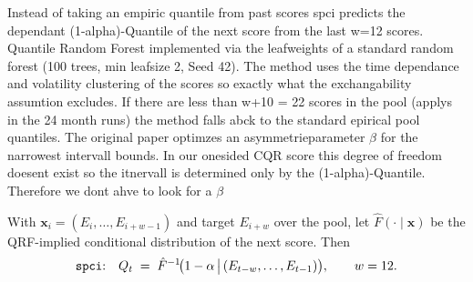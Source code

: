 
Instead of taking an empiric quantile from past scores spci \parencite{xu2023spci} predicts the dependant (1-alpha)-Quantile of the next score from the last w=12 scores. Quantile Random Forest \parencite{meinshausen2006qrf} implemented via the leafweights of a standard random forest (100 trees, min leafsize 2, Seed 42). The method uses the time dependance and volatility clustering of the scores so exactly what the exchangability assumtion excludes. If there are less than w+10 = 22 scores in the pool (applys in the 24 month runs) the method falls abck to the standard epirical pool quantiles. The original paper optimzes an asymmetrieparameter $\beta$ for the narrowest intervall bounds. In our onesided CQR score this degree of freedom doesent exist so the itnervall is determined only by the (1-alpha)-Quantile. Therefore we dont ahve to look for a $\beta$

With $\mathbf{x}_i = (E_{i}, \dots, E_{i+w-1})$ and target $E_{i+w}$ over the
pool, let $\hat F(\cdot \mid \mathbf{x})$ be the QRF-implied conditional
distribution of the next score. Then
\begin{equation}
  \text{\texttt{spci}:}\quad
  Q_t \;=\; \hat F^{-1}\!\big(1 - \alpha \,\big|\, (E_{t-w}, \dots, E_{t-1})\big),
  \qquad w = 12 .
  \label{eq:m-spci}
\end{equation}

